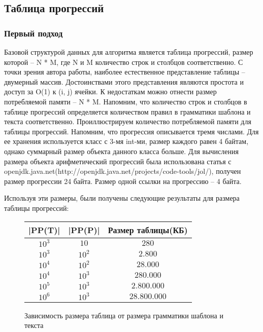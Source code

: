 \documentclass[14pt]{article}
\begin{document}
\subsection{Таблица прогрессий}
\subsubsection{Первый подход}
Базовой структурой данных для алгоритма является таблица прогрессий, размер которой -- N * M, где N и M количество строк и столбцов соответственно. С точки зрения автора работы, наиболее естественное представление таблицы -- двумерный массив. Достоинствами этого представления являются простота и доступ за O(1) к (i, j) ячейки. К недостаткам можно отнести размер потребляемой памяти -- N * M. Напомним, что количество строк и столбцов в таблице прогрессий определяется количеством правил в грамматики шаблона и текста соответственно. Проиллюстрируем количество потребляемой памяти для таблицы прогрессий. Напомним, что прогрессия описывается тремя числами. Для ее хранения используется класс с 3-мя int-ми, размер каждого равен 4 байтам, однако суммарный размер объекта данного класса больше. Для вычисления размера объекта арифметический прогрессий была использована статья с openjdk.java.net(http://openjdk.java.net/projects/code-tools/jol/), получен размер прогрессии 24 байта. Размер одной ссылки на прогрессию -- 4 байта.

Используя эти размеры, были получены следующие результаты для размера таблицы прогрессий:

\begin{figure}
	\begin{center}
    \begin{tabular}{ | c | c | c |}
        \hline |PP(T)| & |PP(P)| & Размер таблицы(КБ) \\
        \hline $10^3$ & $10$ & $280$ \\
        \hline $10^3$ & $10^2$ & $2.800$ \\
        \hline $10^4$ & $10^2$ & $28.000$ \\
        \hline $10^4$ & $10^3$ & $280.000$ \\
        \hline $10^5$ & $10^3$ & $2.800.000$ \\
        \hline $10^6$ & $10^3$ & $28.800.000$ \\
\hline
    \end{tabular}
    \end{center}
    \caption{Зависимость размера таблица от размера грамматики шаблона и текста}
    \label{typical_research}
\end{figure}
\end{document}
